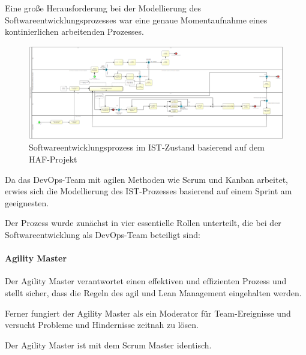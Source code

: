 Eine große Herausforderung bei der Modellierung des Softwareentwicklungsprozesses war eine genaue Momentaufnahme eines kontinierlichen arbeitenden Prozesses. 

\begin{figure}[p]
    \centering
    \includegraphics[angle=90, scale=0.7]{Bilder/IST-Prozess.png}
    \caption{Softwareentwicklungsprozess im IST-Zustand basierend auf dem HAF-Projekt}
\end{figure}

Da das DevOps-Team mit agilen Methoden wie Scrum und Kanban arbeitet, erwies sich die Modellierung des IST-Prozesses basierend auf einem Sprint am geeignesten. 

Der Prozess wurde  zunächst in vier essentielle Rollen unterteilt, die bei der Softwareentwicklung als DevOps-Team beteiligt sind: 

\paragraph{Agility Master}

Der Agility Master verantwortet einen effektiven und effizienten Prozess und stellt sicher, dass die Regeln des agil und Lean Management eingehalten werden. 

Ferner fungiert der Agility Master als ein Moderator für Team-Ereignisse und versucht Probleme und Hindernisse zeitnah zu lösen. 

Der Agility Master ist mit dem Scrum Master identisch. 


